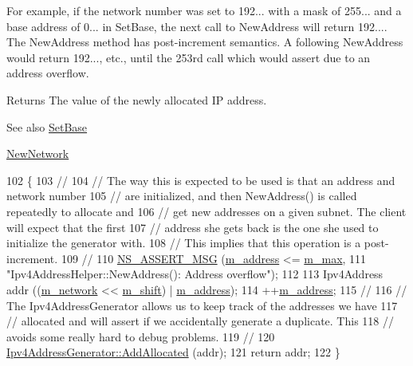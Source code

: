 For example, if the network number was set to 192... with a mask of 255... and a base address of 0... in Set\+Base, the next call to New\+Address will return 192.... The New\+Address method has post-\/increment semantics. A following New\+Address would return 192..., etc., until the 253rd call which would assert due to an address overflow.

\begin{DoxyReturn}{Returns}
The value of the newly allocated IP address. 
\end{DoxyReturn}
\begin{DoxySeeAlso}{See also}
\hyperlink{classns3_1_1Ipv4AddressHelper_acf7b16dd25bac67e00f5e25f90a9a035}{Set\+Base} 

\hyperlink{classns3_1_1Ipv4AddressHelper_a3277d133ef0d2669934a16a8206ba8e4}{New\+Network} 
\end{DoxySeeAlso}

\begin{DoxyCode}
102 \{
103 \textcolor{comment}{//}
104 \textcolor{comment}{// The way this is expected to be used is that an address and network number}
105 \textcolor{comment}{// are initialized, and then NewAddress() is called repeatedly to allocate and}
106 \textcolor{comment}{// get new addresses on a given subnet.  The client will expect that the first}
107 \textcolor{comment}{// address she gets back is the one she used to initialize the generator with.}
108 \textcolor{comment}{// This implies that this operation is a post-increment.}
109 \textcolor{comment}{//}
110   \hyperlink{assert_8h_aff5ece9066c74e681e74999856f08539}{NS\_ASSERT\_MSG} (\hyperlink{classns3_1_1Ipv4AddressHelper_aa68736c00c771186f9bc5add68c791b1}{m\_address} <= \hyperlink{classns3_1_1Ipv4AddressHelper_aa4a0386e78cf9fb6851ffeb47c4ae1db}{m\_max},
111                  \textcolor{stringliteral}{"Ipv4AddressHelper::NewAddress(): Address overflow"});
112 
113   Ipv4Address addr ((\hyperlink{classns3_1_1Ipv4AddressHelper_a33cf40b39d8e89b8ed3db1545371a147}{m\_network} << \hyperlink{classns3_1_1Ipv4AddressHelper_a007ffce20667e8a2187e4fa023589a45}{m\_shift}) | \hyperlink{classns3_1_1Ipv4AddressHelper_aa68736c00c771186f9bc5add68c791b1}{m\_address});
114   ++\hyperlink{classns3_1_1Ipv4AddressHelper_aa68736c00c771186f9bc5add68c791b1}{m\_address};
115 \textcolor{comment}{//}
116 \textcolor{comment}{// The Ipv4AddressGenerator allows us to keep track of the addresses we have}
117 \textcolor{comment}{// allocated and will assert if we accidentally generate a duplicate.  This}
118 \textcolor{comment}{// avoids some really hard to debug problems.}
119 \textcolor{comment}{//}
120   \hyperlink{classns3_1_1Ipv4AddressGenerator_aaf2a4f76afaf064183151f874019e2d6}{Ipv4AddressGenerator::AddAllocated} (addr);
121   \textcolor{keywordflow}{return} addr;
122 \}
\end{DoxyCode}


